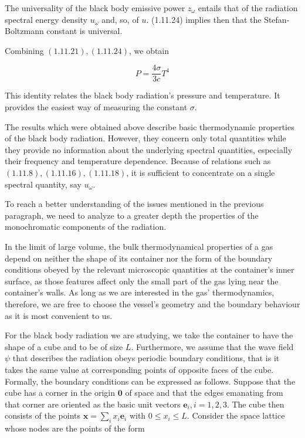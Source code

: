 \documentclass{article}
\begin{document}
The universality of the black body emissive power $z_{\omega}$ entails that of the radiation spectral energy density $u_{\omega}$ and, so, of $u$. (1.11.24) implies then that the Stefan-Boltzmann constant is universal.

Combining $(1.11 .21),(1.11 .24)$, we obtain
 
\begin{equation*}
P=\frac{4 \sigma}{3 c} T^{4} \tag{1.11.30}
\end{equation*}
 

This identity relates the black body radiation's pressure and temperature. It provides the easiest way of measuring the constant $\sigma$.

The results which were obtained above describe basic thermodynamic properties of the black body radiation. However, they concern only total quantities while they provide no information about the underlying spectral quantities, especially their frequency and temperature dependence. Because of relations such as $(1.11 .8),(1.11 .16),(1.11 .18)$, it is sufficient to concentrate on a single spectral quantity, say $u_{\omega}$.

To reach a better understanding of the issues mentioned in the previous paragraph, we need to analyze to a greater depth the properties of the monochromatic components of the radiation.

In the limit of large volume, the bulk thermodynamical properties of a gas depend on neither the shape of its container nor the form of the boundary conditions
obeyed by the relevant microscopic quantities at the container's inner surface, as those features affect only the small part of the gas lying near the container's walls. As long as we are interested in the gas' thermodynamics, therefore, we are free to choose the vessel's geometry and the boundary behaviour as it is most convenient to us.

For the black body radiation we are studying, we take the container to have the shape of a cube and to be of size $L$. Furthermore, we assume that the wave field $\psi$ that describes the radiation obeys periodic boundary conditions, that is it takes the same value at corresponding points of opposite faces of the cube. Formally, the boundary conditions can be expressed as follows. Suppose that the cube has a corner in the origin $\mathbf{0}$ of space and that the edges emanating from that corner are oriented as the basic unit vectors $\boldsymbol{e}_{i}, i=1,2,3$. The cube then consists of the points $\boldsymbol{x}=\sum_{i} x_{i} \boldsymbol{e}_{i}$ with $0 \leq x_{i} \leq L$. Consider the space lattice whose nodes are the points of the form
 
\end{document}
